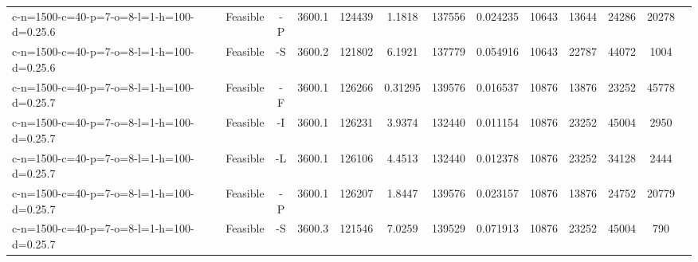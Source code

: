 \documentclass[landscape, a4paper]{article}
\begin{document}
\begin{center}
\begin{tabular}{lcccccccccccc}
c-n=1500-c=40-p=7-o=8-l=1-h=100-d=0.25.6 & Feasible & -P & 3600.1 & 124439 & 1.1818 & 137556 & 0.024235 & 10643 & 13644 & 24286 & 20278 & \\
c-n=1500-c=40-p=7-o=8-l=1-h=100-d=0.25.6 & Feasible & -S & 3600.2 & 121802 & 6.1921 & 137779 & 0.054916 & 10643 & 22787 & 44072 & 1004 & \\
c-n=1500-c=40-p=7-o=8-l=1-h=100-d=0.25.7 & Feasible & -F & 3600.1 & 126266 & 0.31295 & 139576 & 0.016537 & 10876 & 13876 & 23252 & 45778 & \\
c-n=1500-c=40-p=7-o=8-l=1-h=100-d=0.25.7 & Feasible & -I & 3600.1 & 126231 & 3.9374 & 132440 & 0.011154 & 10876 & 23252 & 45004 & 2950 & \\
c-n=1500-c=40-p=7-o=8-l=1-h=100-d=0.25.7 & Feasible & -L & 3600.1 & 126106 & 4.4513 & 132440 & 0.012378 & 10876 & 23252 & 34128 & 2444 & \\
c-n=1500-c=40-p=7-o=8-l=1-h=100-d=0.25.7 & Feasible & -P & 3600.1 & 126207 & 1.8447 & 139576 & 0.023157 & 10876 & 13876 & 24752 & 20779 & \\
c-n=1500-c=40-p=7-o=8-l=1-h=100-d=0.25.7 & Feasible & -S & 3600.3 & 121546 & 7.0259 & 139529 & 0.071913 & 10876 & 23252 & 45004 & 790 & \\
\end{tabular}
\end{center}
\end{document}
